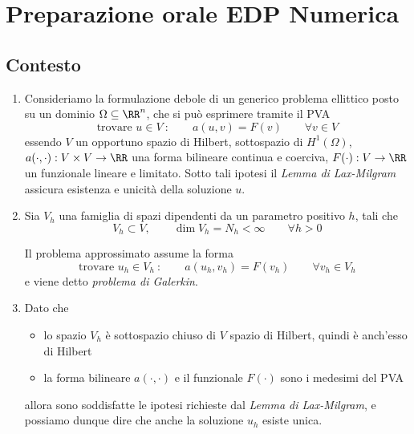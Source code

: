 
\chapter{Preparazione orale EDP Numerica}
\thispagestyle{empty}

\section{Contesto}

\begin{enumerate}
    \item Consideriamo la formulazione debole di un generico problema ellittico posto su un dominio $\Omega\subseteq\RR^n$, che si può esprimere tramite il PVA
    \begin{equation*}
    \text{trovare }u\in V\ :\qquad a(u,v)=F(v)\qquad \forall v \in V
    \end{equation*}
    essendo $V$ un opportuno spazio di Hilbert, sottospazio di $H^1(\Omega)$, $a(\cdot,\cdot):V\times V\to\RR$ una forma bilineare continua e coerciva, $F(\cdot):V\to\RR$ un funzionale lineare e limitato. Sotto tali ipotesi il \emph{Lemma di Lax-Milgram} assicura esistenza e unicità della soluzione $u$.

    \item Sia $V_h$ una famiglia di spazi dipendenti da un parametro positivo $h$, tali che
    \begin{equation*}
    V_h\subset V,\qquad \dim V_h=N_h<\infty\qquad \forall h>0
    \end{equation*}

    Il problema approssimato assume la forma
    \begin{equation*}
    \text{trovare }u_h\in V_h\ :\qquad a(u_h,v_h)=F(v_h)\qquad \forall v_h \in V_h
    \end{equation*}
    e viene detto \emph{problema di Galerkin}.

    \item Dato che 
    \begin{itemize}
        \item lo spazio $V_h$ è sottospazio chiuso di $V$ spazio di Hilbert, quindi è anch'esso di Hilbert
        \item la forma bilineare $a(\cdot,\cdot)$ e il funzionale $F(\cdot)$ sono i medesimi del PVA    
    \end{itemize}
    allora sono soddisfatte le ipotesi richieste dal \emph{Lemma di Lax-Milgram}, e possiamo dunque dire che anche la soluzione $u_h$ esiste unica.


\end{enumerate}
